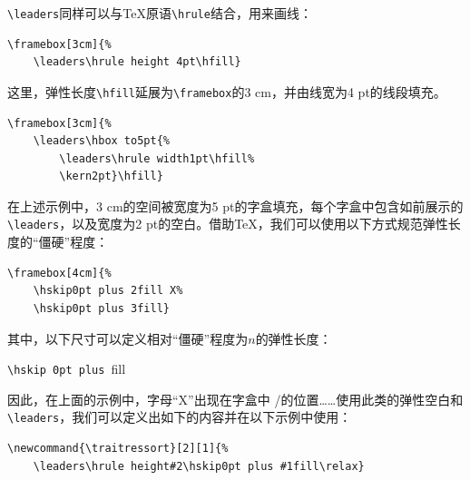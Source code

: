 \verb|\leaders|同样可以与\TeX 原语\verb|\hrule|结合，用来画线：

\begin{codelist}[10.15]{
}\begin{verbatim}
\framebox[3cm]{%
    \leaders\hrule height 4pt\hfill}
\end{verbatim}
\end{codelist}

这里，弹性长度\verb|\hfill|延展为\verb|\framebox|的3 cm，并由线宽为4 pt的线段填充。

\begin{codelist}[10.16]{
}\begin{verbatim}
\framebox[3cm]{%
    \leaders\hbox to5pt{%
        \leaders\hrule width1pt\hfill%
        \kern2pt}\hfill}
\end{verbatim}
\end{codelist}

在上述示例中，3 cm的空间被宽度为5 pt的字盒填充，每个字盒中包含如前展示的\verb|\leaders|，以及宽度为2 pt的空白。借助\TeX ，我们可以使用以下方式规范弹性长度的“僵硬”程度：

\begin{codelist}[10.17]{
}\begin{verbatim}
\framebox[4cm]{%
    \hskip0pt plus 2fill X%
    \hskip0pt plus 3fill}
\end{verbatim}
\end{codelist}

其中，以下尺寸可以定义相对“僵硬”程度为$n$的弹性长度：

\begin{dmd}
\verb|\hskip 0pt plus |fill
\end{dmd}

\newcommand{\mafraction}[2]{%
\raisebox{0.5ex}{#1}%
\slash\raisebox{-0.5ex}{#2}}

因此，在上面的示例中，字母“X”出现在字盒中\mafraction{2}{5}的位置……使用此类的弹性空白和\verb|\leaders|，我们可以定义出如下的内容并在以下示例中使用：

\begin{dmd}
\begin{verbatim}
\newcommand{\traitressort}[2][1]{%
    \leaders\hrule height#2\hskip0pt plus #1fill\relax}
\end{verbatim}
\end{dmd}

